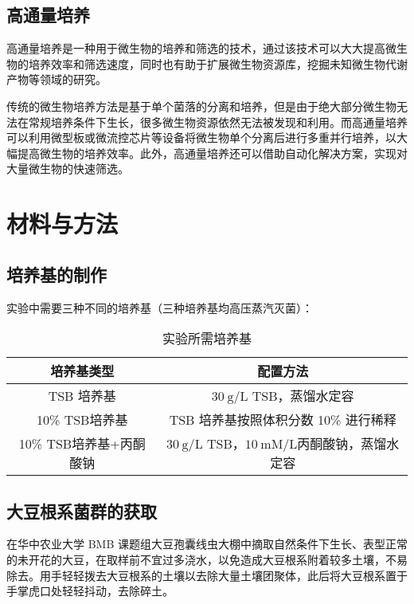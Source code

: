 \documentclass{ctexart}
\begin{document}
    \subsection{高通量培养}

    \qquad 高通量培养是一种用于微生物的培养和筛选的技术，通过该技术可以大大提高微生物的培养效率和筛选速度，同时也有助于扩展微生物资源库，挖掘未知微生物代谢产物等领域的研究。
    
    \qquad 传统的微生物培养方法是基于单个菌落的分离和培养，但是由于绝大部分微生物无法在常规培养条件下生长，很多微生物资源依然无法被发现和利用。而高通量培养可以利用微型板或微流控芯片等设备将微生物单个分离后进行多重并行培养，以大幅提高微生物的培养效率。此外，高通量培养还可以借助自动化解决方案，实现对大量微生物的快速筛选。
    

    \section{材料与方法}

    \subsection{培养基的制作}

    \qquad 实验中需要三种不同的培养基（三种培养基均高压蒸汽灭菌）：

    \begin{table}[htb]
        \centering
        \caption{实验所需培养基}
        \begin{tabular}{cc}
            \toprule
            培养基类型 & 配置方法\\
            \midrule
            TSB 培养基 & $\mathrm{30~g/L}$ TSB，蒸馏水定容\\
            10\% TSB培养基 & TSB 培养基按照体积分数 10\% 进行稀释\\
            10\% TSB培养基+丙酮酸钠 & $\mathrm{30~g/L}$ TSB，$\mathrm{10~mM/L} $丙酮酸钠，蒸馏水定容\\
            \bottomrule
        \end{tabular}
    \end{table}

    \subsection{大豆根系菌群的获取}

    \qquad 在华中农业大学 BMB 课题组大豆孢囊线虫大棚中摘取自然条件下生长、表型正常的未开花的大豆，在取样前不宜过多浇水，以免造成大豆根系附着较多土壤，不易除去。用手轻轻拨去大豆根系的土壤以去除大量土壤团聚体，此后将大豆根系置于手掌虎口处轻轻抖动，去除碎土。
\end{document}
